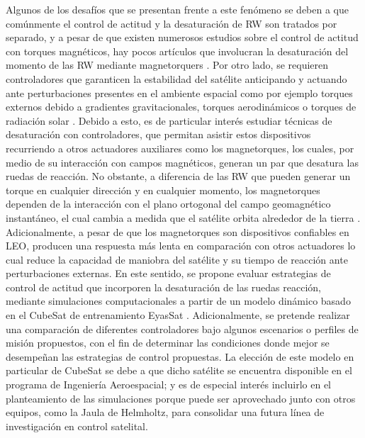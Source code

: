 Algunos de los desafíos que se presentan frente a este fenómeno se deben a que comúnmente el control de actitud y la desaturación de RW son tratados por separado, y a pesar de que existen numerosos estudios sobre el control de actitud con torques magnéticos, hay pocos artículos que involucran la desaturación del momento de las RW mediante magnetorquers \cite{Yang2017}. Por otro lado, se requieren controladores que garanticen la estabilidad del satélite anticipando y actuando ante perturbaciones presentes en el ambiente espacial como por ejemplo torques externos debido a gradientes gravitacionales, torques aerodinámicos o torques de radiación solar \cite{Kaplan1976}.
Debido a esto, es de particular interés estudiar técnicas de desaturación con controladores, que permitan asistir estos dispositivos recurriendo a otros actuadores auxiliares como los magnetorques, los cuales, por medio de su interacción con campos magnéticos, generan un par que desatura las ruedas de reacción. No obstante, a diferencia de las RW que pueden generar un torque en cualquier dirección y en cualquier momento, los magnetorques dependen de la interacción con el plano ortogonal del campo geomagnético instantáneo, el cual cambia a medida que el satélite orbita alrededor de la tierra \cite{Tregouet2015}. Adicionalmente, a pesar de que los magnetorques son dispositivos confiables en LEO, producen una respuesta más lenta en comparación con otros actuadores lo cual reduce la capacidad de maniobra del satélite y su tiempo de reacción ante perturbaciones externas.
En este sentido, se propone evaluar estrategias de control de actitud que incorporen la desaturación de las ruedas reacción, mediante simulaciones computacionales a partir de un modelo dinámico basado en el CubeSat de entrenamiento EyasSat \cite{Eyassat}. Adicionalmente, se pretende realizar una comparación de diferentes controladores bajo algunos escenarios o perfiles de misión propuestos, con el fin de determinar las condiciones donde mejor se desempeñan las estrategias de control propuestas. La elección de este modelo en particular de CubeSat se debe a que dicho satélite se encuentra disponible en el programa de Ingeniería Aeroespacial; y es de especial interés incluirlo en el planteamiento de las simulaciones porque puede ser aprovechado junto con otros equipos, como la Jaula de Helmholtz, para consolidar una futura línea de investigación en control satelital.


\newpage


